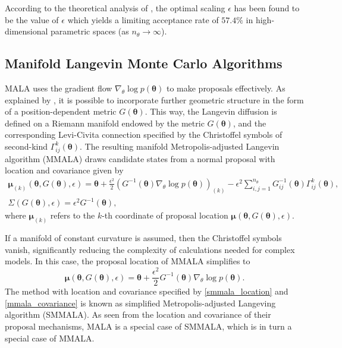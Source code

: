 \documentclass[twoside,11pt]{article}
\begin{document}
According to the theoretical analysis of \cite{rob_ros__opt}, the optimal scaling $\epsilon$ has been found to be the value 
of $\epsilon$ which yields a limiting acceptance rate of $57.4\%$ in high-dimensional parametric spaces 
(as $n_{\theta}\rightarrow\infty$).

\subsection{Manifold Langevin Monte Carlo Algorithms}
\label{smmala_section}

MALA uses the gradient flow $\nabla_{\theta}\log{p(\boldsymbol{\theta})}$ to make proposals effectively.
As explained by \cite{gir_cal__rie}, it is possible to incorporate further geometric structure in the form of a 
position-dependent metric $G(\boldsymbol{\theta})$.
This way, the Langevin diffusion is defined on a Riemann manifold endowed by the metric $G(\boldsymbol{\theta})$, and the
corresponding Levi-Civita connection specified by the Christoffel symbols of second-kind 
$\Gamma^{k}_{ij}(\boldsymbol{\theta})$. The resulting manifold Metropolis-adjusted Langevin algorithm (MMALA) draws 
candidate states from a normal proposal with location and covariance given by
\begin{eqnarray}
\label{mmala_location}
\boldsymbol{\mu}_{(k)}(\boldsymbol{\theta}, G(\boldsymbol{\theta}), \epsilon) =
\boldsymbol{\theta}+
\frac{\epsilon^2}{2}(G^{-1}(\boldsymbol{\theta})\nabla_{\theta}\log{p(\boldsymbol{\theta})})_{(k)}-
\epsilon^2\sum_{i,j=1}^{n_\theta}G^{-1}_{ij}(\boldsymbol{\theta})\Gamma^{k}_{ij}(\boldsymbol{\theta}),\\
\label{mmala_covariance}
\Sigma(G(\boldsymbol{\theta}), \epsilon) = \epsilon^2 G^{-1}(\boldsymbol{\theta}),
\end{eqnarray}
where $\boldsymbol{\mu}_{(k)}$ refers to the $k$-th coordinate of proposal location
$\boldsymbol{\mu}(\boldsymbol{\theta}, G(\boldsymbol{\theta}), \epsilon)$.

If a manifold of constant curvature is assumed, then the Christoffel symbols vanish, significantly reducing the complexity 
of calculations needed for complex models. In this case, the proposal location of MMALA simplifies to
\begin{equation}
\label{smmala_location}
\boldsymbol{\mu}(\boldsymbol{\theta}, G(\boldsymbol{\theta}), \epsilon) =
\boldsymbol{\theta}+
\frac{\epsilon^2}{2}G^{-1}(\boldsymbol{\theta})\nabla_{\theta}\log{p(\boldsymbol{\theta})}.
\end{equation}
The method with location and covariance specified by \eqref{smmala_location} and \eqref{mmala_covariance} is known as 
simplified Metropolis-adjusted Langeving algorithm (SMMALA). As seen from the location and covariance of their proposal 
mechanisms, MALA is a special case of SMMALA, which is in turn a special case of MMALA.
\end{document}
